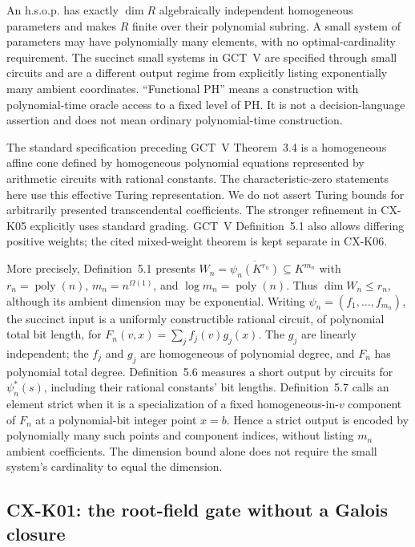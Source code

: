 An h.s.o.p. has exactly $\dim R$ algebraically independent homogeneous
parameters and makes $R$ finite over their polynomial subring. A small
system of parameters may have polynomially many elements, with no
optimal-cardinality requirement. The succinct small systems in GCT~V
are specified through small circuits and are a different output regime
from explicitly listing exponentially many ambient coordinates.
``Functional PH'' means a construction with polynomial-time oracle
access to a fixed level of PH. It is not a decision-language assertion
and does not mean ordinary polynomial-time construction.

The standard specification preceding GCT~V Theorem~3.4 is a homogeneous
affine cone defined by homogeneous polynomial equations represented by
arithmetic circuits with rational constants. The characteristic-zero
statements here use this effective Turing representation. We do not
assert Turing bounds for arbitrarily presented transcendental
coefficients. The stronger refinement in CX-K05 explicitly uses
standard grading. GCT~V Definition~5.1 also allows differing positive
weights; the cited mixed-weight theorem is kept separate in CX-K06.

More precisely, Definition~5.1 presents
$W_n=\overline{\psi_n(K^{r_n})}\subseteq K^{m_n}$ with
$r_n=\operatorname{poly}(n)$, $m_n=n^{\Omega(1)}$, and
$\log m_n=\operatorname{poly}(n)$. Thus
$\dim W_n\le r_n$, although its ambient dimension may be exponential.
Writing $\psi_n=(f_1,\ldots,f_{m_n})$, the succinct input is a
uniformly constructible rational circuit, of polynomial total bit
length, for $F_n(v,x)=\sum_j f_j(v)g_j(x)$. The $g_j$ are linearly
independent; the $f_j$ and $g_j$ are homogeneous of polynomial degree,
and $F_n$ has polynomial total degree. Definition~5.6 measures a short output by circuits for
$\psi_n^*(s)$, including their rational constants' bit lengths.
Definition~5.7 calls an element strict when it is a specialization
of a fixed homogeneous-in-$v$ component of $F_n$ at a polynomial-bit
integer point $x=b$. Hence a strict output is encoded by polynomially
many such points and component indices, without listing $m_n$
ambient coefficients. The dimension bound alone does not require the
small system's cardinality to equal the dimension.

\subsection{CX-K01: the root-field gate without a Galois closure}
\label{cx:k01}

